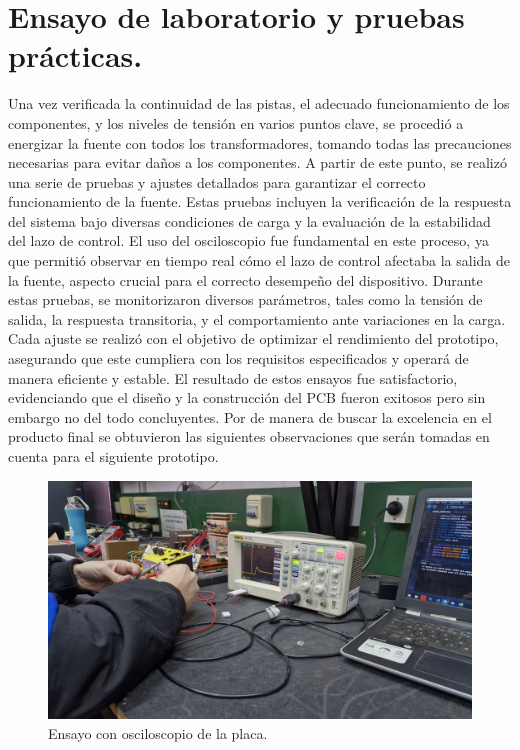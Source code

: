 \section{Ensayo de laboratorio y pruebas prácticas.}
Una vez verificada la continuidad de las pistas, el adecuado funcionamiento de los componentes, y los niveles de tensión en varios puntos clave, se procedió a energizar la fuente con todos los transformadores, tomando todas las precauciones necesarias para evitar daños a los componentes.
A partir de este punto, se realizó una serie de pruebas y ajustes detallados para garantizar el correcto funcionamiento de la fuente. Estas pruebas incluyen la verificación de la respuesta del sistema bajo diversas condiciones de carga y la evaluación de la estabilidad del lazo de control. El uso del osciloscopio fue fundamental en este proceso, ya que permitió observar en tiempo real cómo el lazo de control afectaba la salida de la fuente, aspecto crucial para el correcto desempeño del dispositivo.
Durante estas pruebas, se monitorizaron diversos parámetros, tales como la tensión de salida, la respuesta transitoria, y el comportamiento ante variaciones en la carga. Cada ajuste se realizó con el objetivo de optimizar el rendimiento del prototipo, asegurando que este cumpliera con los requisitos especificados y operará de manera eficiente y estable.
El resultado de estos ensayos fue satisfactorio, evidenciando que el diseño y la construcción del PCB fueron exitosos pero sin embargo no del todo concluyentes. Por de manera de buscar la excelencia en el producto final se obtuvieron las siguientes observaciones que serán tomadas en cuenta para el siguiente prototipo.  
\begin{figure}[H]
    \centering
    \includegraphics[scale=0.1]{./imagenes/fotos/osciloscopio.jpg}
    \caption{Ensayo con osciloscopio de la placa.}
    \label{F:esayos_y_pruebas}
\end{figure}

